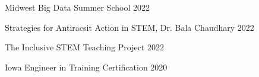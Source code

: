 

\begin{cvhonors}

  \cvhonor
    { } %
    {Midwest Big Data Summer School} %
    { } %
    {2022} %
    
  \cvhonor
    { } %
    {Strategies for Antiracsit Action in STEM, Dr. Bala Chaudhary} %
    { } %
    {2022} %

  \cvhonor
    { } %
    {The Inclusive STEM Teaching Project} %
    { } %
    {2022} %

   \cvhonor
    { } %
    {Iowa Engineer in Training Certification} %
    { } %
    {2020} %




\end{cvhonors}
